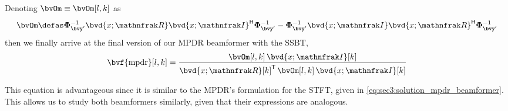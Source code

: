 Denoting $\bvOm \equiv \bvOm[l,k]$ as
\begin{equation}
	\bvOm \defas \iCorr{\bvy'} \bvd{x;\re} \he{\bvd{x;\im}} \iCorr{\bvy'} - \iCorr{\bvy'} \bvd{x;\im} \he{\bvd{x;\re}} \iCorr{\bvy'}
\end{equation}
then we finally arrive at the final version of our MPDR beamformer with the SSBT,
\begin{equation}
	\bvf{\mpdr}[l,k] = \frac{\bvOm[l,k]\, \bvd{x;\im}[k]}{ \tr{\bvd{x;\re}[k]} \,\bvOm[l,k]\, \bvd{x;\im}[k]}
\end{equation}

This equation is advantageous since it is similar to the MPDR's formulation for the STFT, given in \cref{eq:sec3:solution_mpdr_beamformer}. This allows us to study both beamformers similarly, given that their expressions are analogous.